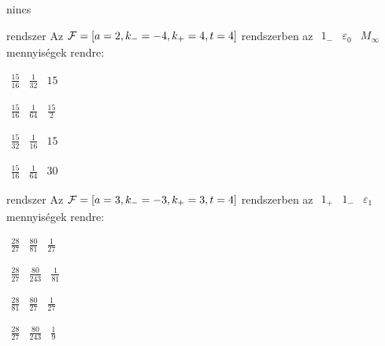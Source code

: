 \documentclass[12pt]{article}
\begin{document}
\begin{quiz}{nincs}
\begin{multi}{rendszer}
Az $  {\cal F}=\left[ a=2, k_{-}=-4, k_{+}=4, t=4 \right]  $ rendszerben az $ \begin{array}{ccc}1_{-}& \varepsilon_{0}& M_{\infty}\end{array} $ mennyiségek rendre: 
\item* $ \begin{array}{ccc}\frac{15}{16}& \frac{1}{32}& 15\end{array} $
\item  $ \begin{array}{ccc}\frac{15}{16}& \frac{1}{64}& \frac{15}{2}\end{array} $
\item  $ \begin{array}{ccc}\frac{15}{32}& \frac{1}{16}& 15\end{array} $
\item  $ \begin{array}{ccc}\frac{15}{16}& \frac{1}{64}& 30\end{array} $
\end{multi}

\begin{multi}{rendszer}
Az $  {\cal F}=\left[ a=3, k_{-}=-3, k_{+}=3, t=4 \right]  $ rendszerben az $ \begin{array}{ccc}1_{+}& 1_{-}& \varepsilon_{1}\end{array} $ mennyiségek rendre: 
\item* $ \begin{array}{ccc}\frac{28}{27}& \frac{80}{81}& \frac{1}{27}\end{array} $
\item  $ \begin{array}{ccc}\frac{28}{27}& \frac{80}{243}& \frac{1}{81}\end{array} $
\item  $ \begin{array}{ccc}\frac{28}{81}& \frac{80}{27}& \frac{1}{27}\end{array} $
\item  $ \begin{array}{ccc}\frac{28}{27}& \frac{80}{243}& \frac{1}{9}\end{array} $
\end{multi}


\end{quiz}
\end{document}
